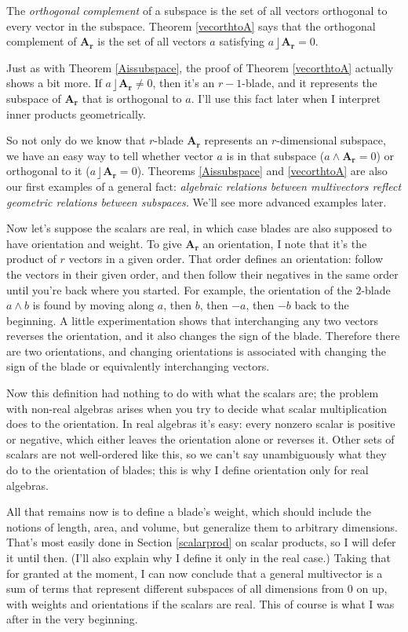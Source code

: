 \documentclass{utarticle}
\newcommand{\bl}[1]{\ensuremath{\bm{#1}}}
\DeclareMathOperator{\lin}{\rfloor}
\DeclareMathOperator{\out}{\wedge}
\begin{document}
The \emph{orthogonal complement} of a subspace is the set of all vectors orthogonal to
every vector in the subspace.  Theorem \ref{vecorthtoA} says that the orthogonal 
complement of \bl{A_r} is the set of all vectors $a$ satisfying $a \lin \bl{A_r} = 0$. 

Just as with Theorem \ref{Aissubspace}, the proof of Theorem \ref{vecorthtoA} actually 
shows a bit more.  If $a \lin \bl{A_r} \neq 0$, then it's an $r-1$-blade, and it represents 
the subspace of \bl{A_r} that is orthogonal to $a$.  I'll use this fact later when I interpret
inner products geometrically.

So not only do we know that $r$-blade \bl{A_r} represents an $r$-dimensional 
subspace, we have an easy way to tell whether vector $a$ is in that subspace 
($a \out \bl{A_r} = 0$) or orthogonal to it ($a \lin \bl{A_r} = 0$). Theorems 
\ref{Aissubspace} and \ref{vecorthtoA} are also our first examples of a general fact: 
\emph{algebraic relations between multivectors reflect geometric relations between 
subspaces.}  We'll see more advanced examples later.

Now let's suppose the scalars are real, in which case blades are also supposed 
to have orientation and weight.  To give \bl{A_r} an orientation, I note that it's the 
product of $r$ vectors in a given order.  That order defines an orientation: follow 
the vectors in their given order, and then follow their negatives in the same order 
until you're back where you started.  For example, the orientation of the $2$-blade 
$a \out b$ is found by moving along $a$, then $b$, then $-a$, then $-b$ back to 
the beginning.  A little experimentation shows that interchanging any two vectors 
reverses the orientation, and it also changes the sign of the blade.  Therefore there 
are two orientations, and changing orientations is associated with changing the 
sign of the blade or equivalently interchanging vectors.

Now this definition had nothing to do with what the scalars
are; the problem with non-real algebras arises when you try to decide what scalar
multiplication does to the orientation.  In real algebras it's easy: every nonzero scalar
is positive or negative, which either leaves the orientation alone or reverses it.  Other
sets of scalars are not well-ordered like this, so we can't say unambiguously what they
do to the orientation of blades; this is why I define orientation only for real algebras.

All that remains now is to define a blade's weight, which should include the notions of
length, area, and volume, but generalize them to arbitrary dimensions.  That's most 
easily done in Section \ref{scalarprod} on scalar products, so I will defer it until then.  
(I'll also explain why I define it only in the real case.)  Taking that for granted at the 
moment, I can now conclude that a general multivector is a sum of terms that represent 
different subspaces of all dimensions from $0$ on up, with weights and orientations 
if the scalars are real.  This of course is what I was after in the very beginning.
\end{document}
